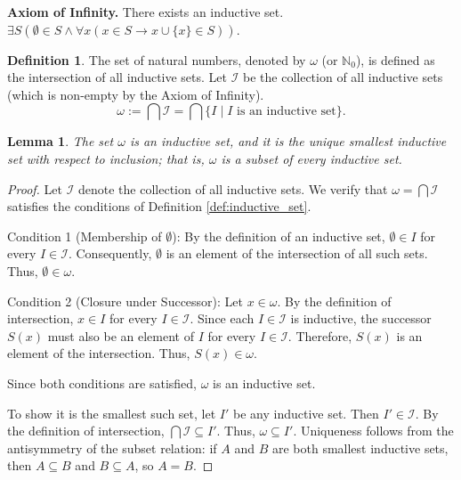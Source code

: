 \documentclass[11pt, a4paper]{article}
\theoremstyle{plain}
\newtheorem{lemma}[theorem]{Lemma}
\theoremstyle{definition}
\newtheorem{definition}[theorem]{Definition}
\numberwithin{equation}{section}
\newcommand{\N}{\mathbb{N}}
\begin{document}
\begin{flushleft}
\textbf{Axiom of Infinity.} There exists an inductive set. $\exists S (\emptyset \in S \land \forall x (x \in S \rightarrow x \cup \{x\} \in S))$.
\end{flushleft}

\begin{definition}\label{def:omega}
The set of natural numbers, denoted by $\omega$ (or $\N_0$), is defined as the intersection of all inductive sets. Let $\mathcal{I}$ be the collection of all inductive sets (which is non-empty by the Axiom of Infinity).
\begin{equation}
    \omega := \bigcap \mathcal{I} = \bigcap \{I \mid I \text{ is an inductive set}\}.
\end{equation}
\end{definition}

\begin{lemma}\label{lem:omega_smallest_inductive}
The set $\omega$ is an inductive set, and it is the unique smallest inductive set with respect to inclusion; that is, $\omega$ is a subset of every inductive set.
\end{lemma}
\begin{proof}
Let $\mathcal{I}$ denote the collection of all inductive sets. We verify that $\omega = \bigcap \mathcal{I}$ satisfies the conditions of Definition \ref{def:inductive_set}.

Condition 1 (Membership of $\emptyset$): By the definition of an inductive set, $\emptyset \in I$ for every $I \in \mathcal{I}$. Consequently, $\emptyset$ is an element of the intersection of all such sets. Thus, $\emptyset \in \omega$.

Condition 2 (Closure under Successor): Let $x \in \omega$. By the definition of intersection, $x \in I$ for every $I \in \mathcal{I}$. Since each $I \in \mathcal{I}$ is inductive, the successor $S(x)$ must also be an element of $I$ for every $I \in \mathcal{I}$. Therefore, $S(x)$ is an element of the intersection. Thus, $S(x) \in \omega$.

Since both conditions are satisfied, $\omega$ is an inductive set.

To show it is the smallest such set, let $I'$ be any inductive set. Then $I' \in \mathcal{I}$. By the definition of intersection, $\bigcap \mathcal{I} \subseteq I'$. Thus, $\omega \subseteq I'$. Uniqueness follows from the antisymmetry of the subset relation: if $A$ and $B$ are both smallest inductive sets, then $A \subseteq B$ and $B \subseteq A$, so $A=B$.
\end{proof}
\end{document}
